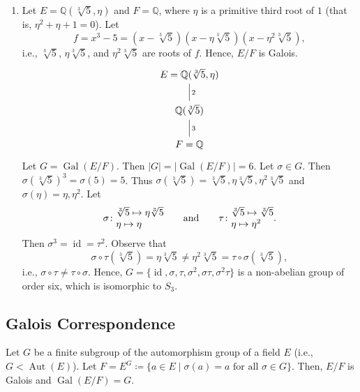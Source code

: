 \documentclass[twoside]{article}
\DeclareMathOperator\Aut{Aut}
\DeclareMathOperator\Gal{Gal}
\DeclareMathOperator\id{id}
\newcommand\Q{\mathbb Q}
\theoremstyle{remark}
\begin{document}
\begin{examples}
\begin{enumerate}[label=\arabic*.]
    \item Let \(E = \Q(\sqrt[3]5,\eta)\) and \(F = \Q\), where \(\eta\) is a primitive third root of \(1\) (that is, \(\eta^2 + \eta + 1 = 0\)). Let
    \[ f = x^3 - 5 = (x - \sqrt[3]5) (x - \eta \sqrt[3]5) (x - \eta^2 \sqrt[3]5), \]
    i.e., \(\sqrt[3]5\), \(\eta \sqrt[3]5\), and \(\eta^2 \sqrt[3]5\) are roots of \(f\). Hence, \(E/F\) is Galois.
    \begin{displaymath}
      \begin{tikzcd}
        E = \Q(\sqrt[3]5, \eta) \dar[dash,"2"] \\
        \Q(\sqrt[3]5) \dar[dash,"3"] \\
        F = \Q
      \end{tikzcd}
    \end{displaymath}
    Let \(G = \Gal(E/F)\). Then \(|G| = \lvert\Gal(E/F)\rvert = 6\). Let \(\sigma \in G\). Then \(\sigma(\sqrt[3]5)^3 = \sigma(5) = 5\). Thus \(\sigma(\sqrt[3]5) = \sqrt[3]5, \eta\sqrt[3]5, \eta^2\sqrt[3]5\) and \(\sigma(\eta) = \eta, \eta^2\). Let
    \[ \sigma\colon \begin{array}{@{}l@{}} \sqrt[3]5 \mapsto \eta\sqrt[3]5 \\ \eta \mapsto \eta \end{array} \qquad \text{and} \qquad \tau\colon \begin{array}{@{}l@{}} \sqrt[3]5 \mapsto \sqrt[3]5 \\ \eta \mapsto \eta^2 \end{array}. \]
    Then \(\sigma^3 = \id = \tau^2\). Observe that
    \[ \sigma\circ\tau(\sqrt[3]5) = \eta\sqrt[3]5 \neq \eta^2\sqrt[3]5 = \tau\circ\sigma(\sqrt[3]5), \]
    i.e., \(\sigma\circ\tau \neq \tau\circ\sigma\). Hence, \(G = \{\id, \sigma, \tau, \sigma^2, \sigma\tau, \sigma^2\tau\}\) is a non-abelian group of order six, which is isomorphic to \(S_3\).
  \end{enumerate}
\end{examples}

\subsection{Galois Correspondence}

\begin{lemma}[Artin]
  Let \(G\) be a finite subgroup of the automorphism group of a field \(E\) (i.e., \(G < \Aut(E)\)). Let \(F = E^G \coloneq \{a \in E \mid \sigma(a) = a \text{ for all } \sigma \in G\}\). Then, \(E/F\) is Galois and \(\Gal(E/F) = G\).
\end{lemma}
\end{document}
